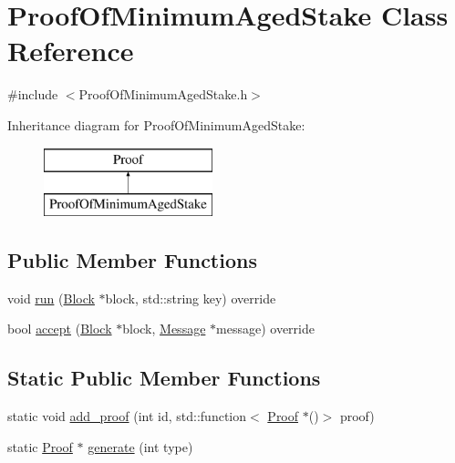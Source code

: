 \hypertarget{classProofOfMinimumAgedStake}{}\section{Proof\+Of\+Minimum\+Aged\+Stake Class Reference}
\label{classProofOfMinimumAgedStake}


{\ttfamily \#include $<$Proof\+Of\+Minimum\+Aged\+Stake.\+h$>$}

Inheritance diagram for Proof\+Of\+Minimum\+Aged\+Stake\+:\begin{figure}[H]
\begin{center}
\leavevmode
\includegraphics[height=2.000000cm]{classProofOfMinimumAgedStake}
\end{center}
\end{figure}
\subsection*{Public Member Functions}
\begin{DoxyCompactItemize}
\item 
void \mbox{\hyperlink{classProofOfMinimumAgedStake_aa850369d6f8ebf7fa833821a43049147}{run}} (\mbox{\hyperlink{classBlock}{Block}} $\ast$block, std\+::string key) override
\item 
bool \mbox{\hyperlink{classProofOfMinimumAgedStake_add68213606b37c50390cf1a0dd16c17b}{accept}} (\mbox{\hyperlink{classBlock}{Block}} $\ast$block, \mbox{\hyperlink{classMessage}{Message}} $\ast$message) override
\end{DoxyCompactItemize}
\subsection*{Static Public Member Functions}
\begin{DoxyCompactItemize}
\item 
static void \mbox{\hyperlink{classProof_a71874539fdbcc93c15594b889c95225b}{add\+\_\+proof}} (int id, std\+::function$<$ \mbox{\hyperlink{classProof}{Proof}} $\ast$()$>$ proof)
\item 
static \mbox{\hyperlink{classProof}{Proof}} $\ast$ \mbox{\hyperlink{classProof_a267f0f4587babb59884b5f280e2d54c8}{generate}} (int type)
\end{DoxyCompactItemize}
